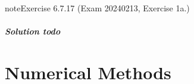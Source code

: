 \documentclass[letterpaper,10pt,english]{jupyterBook}
\begin{document}
\begin{sphinxadmonition}{note}{Exercise 6.7.17 (Exam 2024\sphinxhyphen{}02\sphinxhyphen{}13, Exercise 1a.)}



\begin{figure}[htbp]
\centering

\noindent{}
\end{figure}
\subsubsection*{Solution \sphinxhyphen{} todo}
\end{sphinxadmonition}

\sphinxstepscope


\part{Numerical Methods}

\sphinxstepscope
\end{document}
